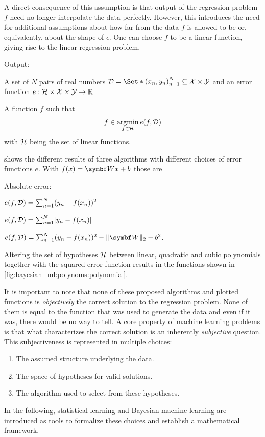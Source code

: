 A direct consequence of this assumption is that output of the regression problem $f$ need no longer interpolate the data perfectly.
However, this introduces the need for additional assumptions about how far from the data $f$ is allowed to be or, equivalently, about the shape of $\epsilon$.
One can choose $f$ to be a linear function, giving rise to the linear regression problem.
\begin{problem}
\begin{labeling}{Output:}
    \item[Input:] A set of $N$ pairs of real numbers $\Dc = \Set*{\left(x_n, y_n\right)}_{n=1}^N \subseteq \Xc \times \Yc$ and an error function $e : \mathcal{H} \times \mathcal{X} \times \mathcal{Y} \to \mathbb{R}$
    \item[Output:] A function $f$ such that
    \begin{align}
        f \in \operatorname*{argmin}_{f \in \mathcal{H}} e(f, \mathcal{D})
    \end{align}
    with $\mathcal{H}$ being the set of linear functions.
\end{labeling}
\end{problem}
 shows the different results of three algorithms with different choices of error functions $e$.
With $f(x) = \mat{W}x + b$ those are
\begin{labeling}{Absolute error:}
    \item[Squared error:] $e(f, \mathcal{D}) = \sum_{n=1}^N (y_n - f(x_n))^2$
    \item[Absolute error:] $e(f, \Dc) = \sum_{n=1}^N \abs{y_n - f(x_n)}$
    \item[Ridge:] $e(f, \Dc) = \sum_{n=1}^N (y_n - f(x_n))^2 - \norm{\mat{W}}_2 - b^2$.
\end{labeling}
Altering the set of hypotheses $\mathcal{H}$ between linear, quadratic and cubic polynomials together with the squared error function results in the functions shown in \cref{fig:bayesian_ml:polynoms:polynomial}.

It is important to note that none of these proposed algorithms and plotted functions is \emph{objectively} the correct solution to the regression problem.
None of them is equal to the function that was used to generate the data and even if it was, there would be no way to tell.
A core property of machine learning problems is that what characterizes the correct solution is an inherently \emph{subjective} question.
This subjectiveness is represented in multiple choices:
\begin{enumerate}
    \item The assumed structure underlying the data.
    \item The space of hypotheses for valid solutions.
    \item The algorithm used to select from these hypotheses.
\end{enumerate}
In the following, statistical learning and Bayesian machine learning are introduced as tools to formalize these choices and establish a mathematical framework.

